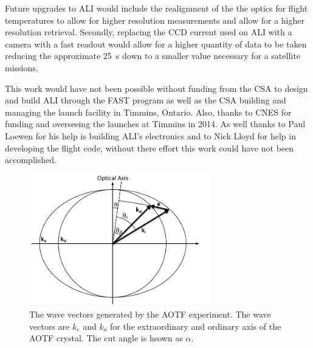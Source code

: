 \documentclass[12pt]{article}
\begin{document}
Future upgrades to ALI would include the realignment of the the optics for flight temperatures to allow for higher resolution measurements and allow for a higher resolution retrieval. Secondly, replacing the CCD current used on ALI with a camera with a fast readout would allow for a higher quantity of data to be taken reducing the approximate 25~s down to a smaller value necessary for a satellite missions.

This work would have not been possible without funding from the CSA to design and build ALI through the FAST program as well as the CSA building and managing the launch facility in Timmins, Ontario. Also, thanks to CNES for funding and overseeing the launches at Timmins in 2014. As well thanks to Paul Loewen for his help is building ALI's electronics and to Nick Lloyd for help in developing the flight code, without there effort this work could have not been accomplished.


\newpage



\newpage

\begin{figure}
    \begin{center}
    \includegraphics[width=0.7\textwidth]{./Images/3-1-AOTFWavevectorWithRefraction.pdf}
    \caption{The wave vectors generated by the AOTF experiment. The wave vectors are $k_{e}$ and $k_{o}$ for the extraordinary and ordinary axis of the AOTF crystal. The cut angle is hsown as $\alpha$.}
    \label{fig:3.1:ATOFWavevectors}
    \end{center}
\end{figure}
\end{document}
